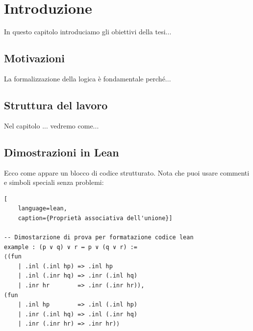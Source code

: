 \chapter{Introduzione}
\label{chap:introduzione}

In questo capitolo introduciamo gli obiettivi della tesi...

\section{Motivazioni}
La formalizzazione della logica è fondamentale perché...

\section{Struttura del lavoro}
Nel capitolo ... vedremo come...

\section{Dimostrazioni in Lean}

Ecco come appare un blocco di codice strutturato. Nota che puoi usare commenti e simboli speciali senza problemi:

\begin{lstlisting}[
    language=lean, 
    caption={Proprietà associativa dell'unione}]

-- Dimostarzione di prova per formatazione codice lean
example : (p ∨ q) ∨ r ↔ p ∨ (q ∨ r) :=
⟨(fun
    | .inl (.inl hp) => .inl hp
    | .inl (.inr hq) => .inr (.inl hq)
    | .inr hr        => .inr (.inr hr)),
(fun
    | .inl hp        => .inl (.inl hp)
    | .inr (.inl hq) => .inl (.inr hq)
    | .inr (.inr hr) => .inr hr)⟩
\end{lstlisting}